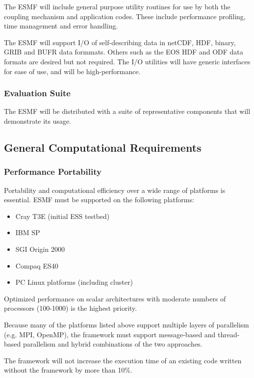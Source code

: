 The ESMF will include general purpose utility routines for use by both 
the coupling mechanism and application codes.  These include
performance profiling, time management and error handling.

The ESMF will support I/O of self-describing data in netCDF, HDF, 
binary, GRIB and BUFR data formmats.  Others such as the EOS HDF and ODF 
data formats are desired but not required.  The I/O utilities will 
have generic interfaces for ease of use, and will be high-performance.

\subsubsection{Evaluation Suite}

The ESMF will be distributed with a suite of representative components
that will demonstrate its usage.

\subsection{General Computational Requirements}

\subsubsection{Performance Portability}

Portability and computational efficiency over a wide range of platforms
is essential.  ESMF must be supported on the following platforms:
\begin{itemize}
\item Cray T3E (initial ESS testbed)
\item IBM SP
\item SGI Origin 2000
\item Compaq ES40
\item PC Linux platforms (including cluster)
\end{itemize}

Optimized performance on scalar architectures with moderate numbers of 
processors (100-1000) is the highest priority. 

Because many of the platforms listed above support multiple 
layers of parallelism (e.g. MPI, OpenMP),  the framework
must support message-based and thread-based parallelism and
hybrid combinations of the two approaches.

The framework will not increase the execution time of an existing code
written without the framework by more than 10\%.

